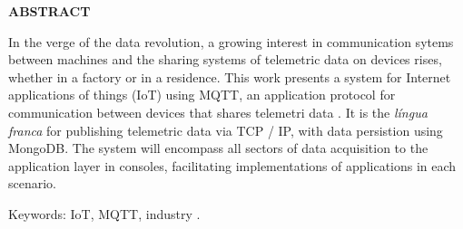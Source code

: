 \begin{center}
\textbf{ABSTRACT}
\end{center}

$\!$\\


In the verge of the data revolution, a growing interest in communication sytems between machines and the sharing systems of telemetric data on devices rises, whether in a factory or in a residence. This work presents a system for Internet applications of things (IoT) using MQTT, an application protocol for communication between devices that shares telemetri data . It is the \textit{língua franca} for publishing telemetric data via TCP / IP, with data persistion using MongoDB. The system will  encompass all sectors of data acquisition to the application layer in consoles, facilitating implementations of applications in each scenario.

\vspace{1cm}

\hspace{-1.3cm}Keywords: IoT, MQTT, industry .